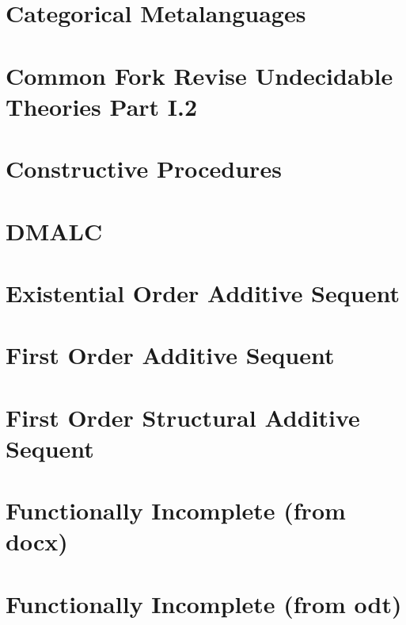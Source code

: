 \documentclass{report}
\begin{document}
\chapter{Categorical Metalanguages}
%

\chapter{Common Fork Revise Undecidable Theories Part I.2}
%

\chapter{Constructive Procedures}
%

\chapter{DMALC}


\chapter{Existential Order Additive Sequent}


\chapter{First Order Additive Sequent}


\chapter{First Order Structural Additive Sequent}


\chapter{Functionally Incomplete (from docx)}


\chapter{Functionally Incomplete (from odt)}

\end{document}
